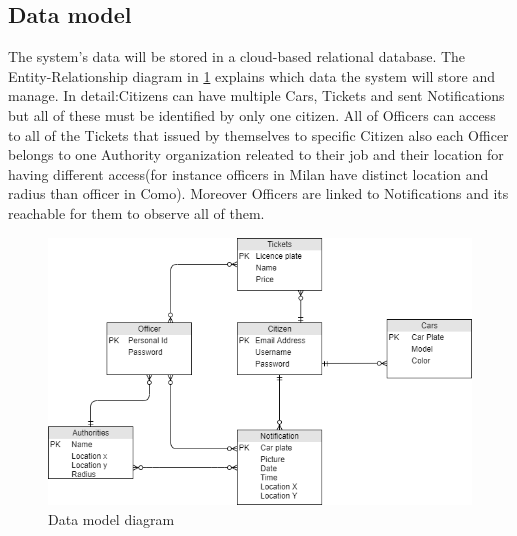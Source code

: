 \documentclass{article}
\begin{document}
	\subsection{Data model} The system's data will be stored in a cloud-based relational database. The Entity-Relationship diagram in \cref{fig:DataModel} explains which data the system will store and manage. In detail:Citizens can have multiple Cars, Tickets and sent Notifications but all of these must be identified by only one citizen. All of Officers can access to all of the Tickets that issued by themselves to specific Citizen also each Officer belongs to one Authority organization releated to their job and their location for having different access(for instance officers in Milan have distinct location and radius than officer in Como). Moreover Officers are linked to Notifications and its reachable for them to observe all of them.  
	\begin{figure}[h]
		\includegraphics[width=\linewidth]{images/Data_model_diagram.png}
		\caption{Data model diagram}
		\label{fig:DataModel}
	\end{figure}
	\FloatBarrier
\end{document}
